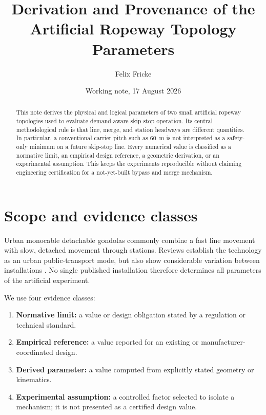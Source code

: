 \documentclass[11pt,a4paper]{scrartcl}
\title{Derivation and Provenance of the Artificial Ropeway Topology Parameters}
\author{Felix Fricke}
\date{Working note, 17 August 2026}
\begin{document}
\maketitle

\begin{abstract}
This note derives the physical and logical parameters of two small artificial
ropeway topologies used to evaluate demand-aware skip-stop operation.  Its
central methodological rule is that line, merge, and station headways are
different quantities.  In particular, a conventional carrier pitch such as
60~m is not interpreted as a safety-only minimum on a future skip-stop line.
Every numerical value is classified as a normative limit, an empirical design
reference, a geometric derivation, or an experimental assumption.  This keeps
the experiments reproducible without claiming engineering certification for a
not-yet-built bypass and merge mechanism.
\end{abstract}

\tableofcontents

\section{Scope and evidence classes}

Urban monocable detachable gondolas commonly combine a fast line movement
with slow, detached movement through stations.  Reviews establish the
technology as an urban public-transport mode, but also show considerable
variation between installations \cite{alshalalfah2012,ppiaf2020}.  No single
published installation therefore determines all parameters of the artificial
experiment.

We use four evidence classes:
\begin{enumerate}[label=\textbf{E\arabic*.},leftmargin=*]
  \item \textbf{Normative limit:} a value or design obligation stated by a
    regulation or technical standard.
  \item \textbf{Empirical reference:} a value reported for an existing or
    manufacturer-coordinated design.
  \item \textbf{Derived parameter:} a value computed from explicitly stated
    geometry or kinematics.
  \item \textbf{Experimental assumption:} a controlled factor selected to
    isolate a mechanism; it is not presented as a certified design value.
\end{enumerate}
\end{document}
